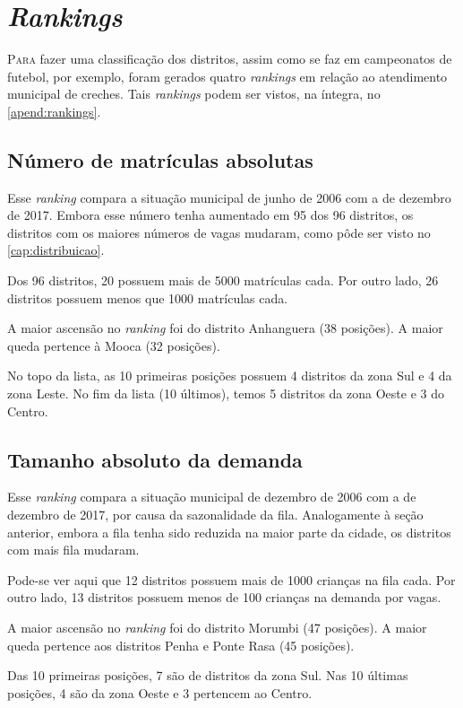 \chapter{\textit{Rankings}}
\label{cap:rankings}

\lettrine{P}{ara} fazer uma classificação dos distritos, assim como se faz em campeonatos de futebol, por exemplo, foram gerados quatro \textit{rankings} em relação ao atendimento municipal de creches. Tais \textit{rankings} podem ser vistos, na íntegra, no \autoref{apend:rankings}.

\section{Número de matrículas absolutas}

Esse \textit{ranking} compara a situação municipal de junho de 2006 com a de dezembro de 2017. Embora esse número tenha aumentado em 95 dos 96 distritos, os distritos com os maiores números de vagas mudaram, como pôde ser visto no \autoref{cap:distribuicao}.

Dos 96 distritos, 20 possuem mais de 5000 matrículas cada. Por outro lado, 26 distritos possuem menos que 1000 matrículas cada.

A maior ascensão no \textit{ranking} foi do distrito Anhanguera (38 posições). A maior queda pertence à Mooca (32 posições).

No topo da lista, as 10 primeiras posições possuem 4 distritos da zona Sul e 4 da zona Leste. No fim da lista (10 últimos), temos 5 distritos da zona Oeste e 3 do Centro.

\section{Tamanho absoluto da demanda}

Esse \textit{ranking} compara a situação municipal de dezembro de 2006 com a de dezembro de 2017, por causa da sazonalidade da fila. Analogamente à seção anterior, embora a fila tenha sido reduzida na maior parte da cidade, os distritos com mais fila mudaram.

Pode-se ver aqui que 12 distritos possuem mais de 1000 crianças na fila cada. Por outro lado, 13 distritos possuem menos de 100 crianças na demanda por vagas.

A maior ascensão no \textit{ranking} foi do distrito Morumbi (47 posições). A maior queda pertence aos distritos Penha e Ponte Rasa (45 posições).

Das 10 primeiras posições, 7 são de distritos da zona Sul. Nas 10 últimas posições, 4 são da zona Oeste e 3 pertencem ao Centro.

